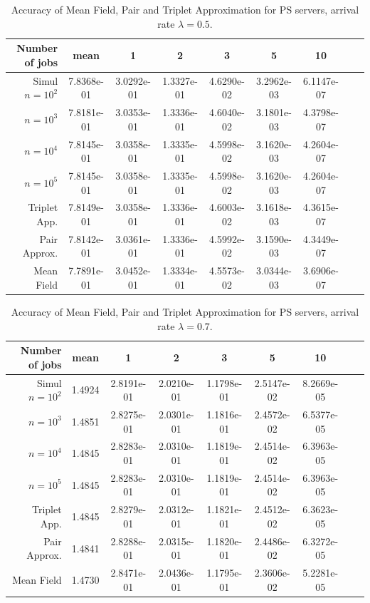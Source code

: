 \documentclass[acmsmall,nonacm]{acmart}
\begin{document}
\begin{table}[ht]
    \centering
    \begin{tabular}{|r|c|c|c|c|c|c|c|c|}
    \hline 
        Number of jobs & mean & 1 & 2 & 3 & 5 & 10\\ \hline
\hline
Simul $n=10^2$&7.8368e-01  & 3.0292e-01 &  1.3327e-01 &  4.6290e-02  & 3.2962e-03 &  6.1147e-07\\
 $n=10^3$&   7.8181e-01 &  3.0353e-01  & 1.3336e-01&   4.6040e-02  & 3.1801e-03&   4.3798e-07\\
 $n=10^4$&   7.8145e-01 &  3.0358e-01  & 1.3335e-01&   4.5998e-02  & 3.1620e-03&   4.2604e-07\\
 $n=10^5$&   7.8145e-01 &  3.0358e-01  & 1.3335e-01 &  4.5998e-02  & 3.1620e-03&   4.2604e-07\\ \hline
Triplet App. &7.8149e-01  & 3.0358e-01 &  1.3336e-01  & 4.6003e-02  & 3.1618e-03  & 4.3615e-07 \\\hline
Pair Approx.&   7.8142e-01 &  3.0361e-01  & 1.3336e-01 &  4.5992e-02  & 3.1590e-03&   4.3449e-07\\\hline
Mean Field&   7.7891e-01 &  3.0452e-01  & 1.3334e-01 &  4.5573e-02  & 3.0344e-03&   3.6906e-07\\         \hline
    \end{tabular}
    \caption{Accuracy of Mean Field, Pair and Triplet Approximation for PS servers, arrival rate $\lambda=0.5$. }
    \label{tab:simulPAIR05}
\end{table}

\begin{table}[ht]
    \centering
    \begin{tabular}{|r|c|c|c|c|c|c|c|c|}
    \hline 
        Number of jobs & mean & 1 & 2 & 3 & 5 & 10\\ \hline
        \hline
Simul $n=10^2$ &1.4924  & 2.8191e-01  & 2.0210e-01  & 1.1798e-01  & 2.5147e-02  & 8.2669e-05\\
 $n=10^3$ &   1.4851 & 2.8275e-01 &  2.0301e-01 &  1.1816e-01  & 2.4572e-02 &  6.5377e-05\\
 $n=10^4$ &   1.4845 &  2.8283e-01 &  2.0310e-01&   1.1819e-01 &  2.4514e-02 &  6.3963e-05\\
 $n=10^5$ &   1.4845 &  2.8283e-01 &  2.0310e-01&   1.1819e-01 &  2.4514e-02 &  6.3963e-05\\\hline
Triplet App. & 1.4845 &  2.8279e-01  & 2.0312e-01  & 1.1821e-01   &2.4512e-02   &6.3623e-05\\\hline
Pair Approx. &   1.4841 &  2.8288e-01 &  2.0315e-01&   1.1820e-01 &  2.4486e-02 &  6.3272e-05\\ \hline
Mean Field &   1.4730 &  2.8471e-01 &  2.0436e-01&   1.1795e-01 &  2.3606e-02 &  5.2281e-05 \\ 
         \hline
    \end{tabular}
    \caption{Accuracy of Mean Field, Pair and Triplet Approximation for PS servers, arrival rate $\lambda=0.7$. }
    \label{tab:simulPAIR07}
\end{table}
\end{document}
